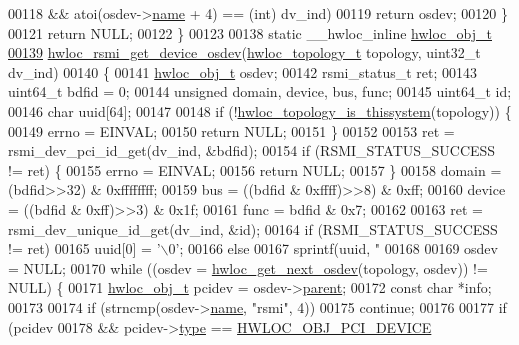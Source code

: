 \begin{DoxyCode}
{00118       && atoi(osdev->\hyperlink{a00238_abb709ec38f2970677e4e57d1d30be96d}{name} + 4) == (\textcolor{keywordtype}{int}) dv\_ind)
00119       \textcolor{keywordflow}{return} osdev;
00120   \}
00121   \textcolor{keywordflow}{return} NULL;
00122 \}
00123 
00138 \textcolor{keyword}{static} \_\_hwloc\_inline \hyperlink{a00238}{hwloc\_obj\_t}
\hyperlink{a00222_gaba05bf9710655bb5b1439bee654340ba}{00139} \hyperlink{a00222_gaba05bf9710655bb5b1439bee654340ba}{hwloc\_rsmi\_get\_device\_osdev}(\hyperlink{a00186_ga9d1e76ee15a7dee158b786c30b6a6e38}{hwloc\_topology\_t} topology, uint32\_t 
      dv\_ind)
00140 \{
00141   \hyperlink{a00238}{hwloc\_obj\_t} osdev;
00142   rsmi\_status\_t ret;
00143   uint64\_t bdfid = 0;
00144   \textcolor{keywordtype}{unsigned} domain, device, bus, func;
00145   uint64\_t id;
00146   \textcolor{keywordtype}{char} uuid[64];
00147 
00148   \textcolor{keywordflow}{if} (!\hyperlink{a00193_ga68ffdcfd9175cdf40709801092f18017}{hwloc\_topology\_is\_thissystem}(topology)) \{
00149     errno = EINVAL;
00150     \textcolor{keywordflow}{return} NULL;
00151   \}
00152 
00153   ret = rsmi\_dev\_pci\_id\_get(dv\_ind, &bdfid);
00154   \textcolor{keywordflow}{if} (RSMI\_STATUS\_SUCCESS != ret) \{
00155     errno = EINVAL;
00156     \textcolor{keywordflow}{return} NULL;
00157   \}
00158   domain = (bdfid>>32) & 0xffffffff;
00159   bus = ((bdfid & 0xffff)>>8) & 0xff;
00160   device = ((bdfid & 0xff)>>3) & 0x1f;
00161   func = bdfid & 0x7;
00162 
00163   ret = rsmi\_dev\_unique\_id\_get(dv\_ind, &\textcolor{keywordtype}{id});
00164   \textcolor{keywordflow}{if} (RSMI\_STATUS\_SUCCESS != ret)
00165     uuid[0] = \textcolor{charliteral}{'\(\backslash\)0'};
00166   \textcolor{keywordflow}{else}
00167     sprintf(uuid, \textcolor{stringliteral}{"%
00168 
00169   osdev = NULL;
00170   \textcolor{keywordflow}{while} ((osdev = \hyperlink{a00204_ga8b4584c8949e2c5f1c97ba7fe92b8145}{hwloc\_get\_next\_osdev}(topology, osdev)) != NULL) \{
00171     \hyperlink{a00238}{hwloc\_obj\_t} pcidev = osdev->\hyperlink{a00238_adc494f6aed939992be1c55cca5822900}{parent};
00172     \textcolor{keyword}{const} \textcolor{keywordtype}{char} *info;
00173 
00174     \textcolor{keywordflow}{if} (strncmp(osdev->\hyperlink{a00238_abb709ec38f2970677e4e57d1d30be96d}{name}, \textcolor{stringliteral}{"rsmi"}, 4))
00175       \textcolor{keywordflow}{continue};
00176 
00177     \textcolor{keywordflow}{if} (pcidev
00178       && pcidev->\hyperlink{a00238_acc4f0803f244867e68fe0036800be5de}{type} == \hyperlink{a00184_ggacd37bb612667dc437d66bfb175a8dc55a5d8117a54df1fbd3606ab19e42cb0ea9}{HWLOC\_OBJ\_PCI\_DEVICE}
}}
\end{DoxyCode}
